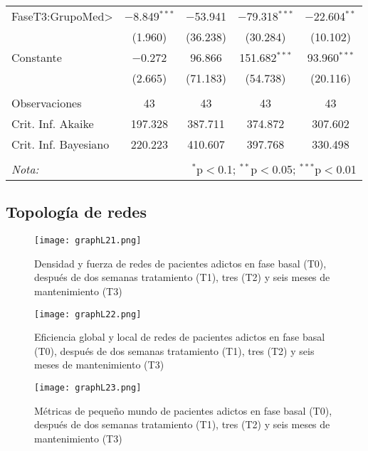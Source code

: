 \begin{table}[!htbp]
\begin{tabular}{@{\extracolsep{5pt}}lcccc}
  FaseT3:GrupoMed\textgreater  & $-$8.849$^{***}$ & $-$53.941 & $-$79.318$^{***}$ & $-$22.604$^{**}$ \\
  & (1.960) & (36.238) & (30.284) & (10.102) \\
  Constante & $-$0.272 & 96.866 & 151.682$^{***}$ & 93.960$^{***}$ \\
  & (2.665) & (71.183) & (54.738) & (20.116) \\
 \hline \\[-1.8ex]
Observaciones & 43 & 43 & 43 & 43 \\
Crit. Inf. Akaike & 197.328 & 387.711 & 374.872 & 307.602 \\
Crit. Inf. Bayesiano & 220.223 & 410.607 & 397.768 & 330.498 \\
\hline
\hline \\[-1.8ex]
\textit{Nota:}  & \multicolumn{4}{r}{$^{*}$p$<$0.1; $^{**}$p$<$0.05; $^{***}$p$<$0.01} \\
\end{tabular}
\end{table}

\FloatBarrier
\subsection{Topología de redes}

\begin{figure}[!ht]
    \centering
    \texttt{[image: graphL21.png]}
    \caption{Densidad y fuerza de redes de pacientes adictos en fase basal (T0), después de dos semanas tratamiento (T1), tres (T2) y seis meses de mantenimiento (T3)}
    \label{fig:gpL21}
\end{figure}

\begin{figure}[!ht]
    \centering
    \texttt{[image: graphL22.png]}
    \caption{Eficiencia global y local de redes de pacientes adictos en fase basal (T0), después de dos semanas tratamiento (T1), tres (T2) y seis meses de mantenimiento (T3)}
    \label{fig:gpL22}
\end{figure}

\begin{figure}[!ht]
    \centering
    \texttt{[image: graphL23.png]}
    \caption{Métricas de pequeño mundo de pacientes adictos en fase basal (T0), después de dos semanas tratamiento (T1), tres (T2) y seis meses de mantenimiento (T3)}
    \label{fig:gpL23}
\end{figure}



